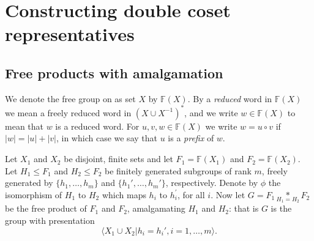 \documentclass[a4paper,12pt]{article}
\numberwithin{equation}{section}
\numberwithin{figure}{section}
\newcommand{\FF}{\ensuremath{\mathbb{F}}}
\newcommand{\la}{\langle}
\newcommand{\ra}{\rangle}
\begin{document}
\section{Constructing double coset representatives}\label{sec:dcforms}
\subsection{Free products with amalgamation}\label{sec:intro}

We denote the free group on as set $X$ by $\FF(X)$. 
 By a {\em reduced} word in $\FF(X)$  we mean
 a freely reduced word in $(X\cup X^{-1})^\ast$, and we write $w\in \FF(X)$
to mean that $w$ is a reduced word. For $u,v, w\in \FF(X)$ we
write $w=u\circ v$ if $|w|=|u|+|v|$, in which case we say that $u$ is a {\em prefix}
of $w$.

Let $X_1$ and $X_2$ be disjoint,
finite sets and let 
$F_1=\FF(X_1)$ and $F_2=\FF(X_2)$.
Let $H_1 \leq F_1$ and  $H_2 \leq F_2$ be finitely generated subgroups of rank $m$,
freely generated by $\{h_1,\ldots, h_m\}$ and  $\{h_1', \ldots, h_m'\}$, respectively. 
Denote by $\phi$ the isomorphism of $H_1$ to $H_2$ which maps $h_i$ to  $h_i^\prime$, 
for all $i$. 
 Now let $G = F_1 \underset{H_1=H_2}{\ast} F_2$ be the free product  of $F_1$ and $F_2$, amalgamating $H_1$ and $H_2$: that is $G$ is the group 
 with
 presentation \[\la X_1\cup X_2 | h_i = h_i', i=1, \ldots ,m\ra.\]
\end{document}
